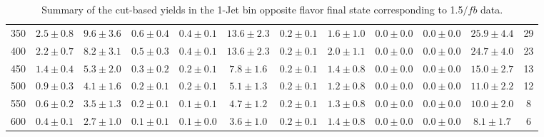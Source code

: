 \begin{table}[!hb]
{\begin{center}
\begin{tabular}{l c c c c c c c c c c c }
350 & $2.5\pm0.8$ & $9.6\pm3.6$ & $0.6\pm0.4$ & $0.4\pm0.1$ & $13.6\pm2.3$ & $0.2\pm0.1$ & $1.6\pm1.0$ & $0.0\pm0.0$ & $0.0\pm0.0$ & $25.9\pm4.4$ & 29 \\
400 & $2.2\pm0.7$ & $8.2\pm3.1$ & $0.5\pm0.3$ & $0.4\pm0.1$ & $13.6\pm2.3$ & $0.2\pm0.1$ & $2.0\pm1.1$ & $0.0\pm0.0$ & $0.0\pm0.0$ & $24.7\pm4.0$ & 23 \\
450 & $1.4\pm0.4$ & $5.3\pm2.0$ & $0.3\pm0.2$ & $0.2\pm0.1$ & $7.8\pm1.6$ & $0.2\pm0.1$ & $1.4\pm0.8$ & $0.0\pm0.0$ & $0.0\pm0.0$ & $15.0\pm2.7$ & 13 \\
500 & $0.9\pm0.3$ & $4.1\pm1.6$ & $0.2\pm0.1$ & $0.2\pm0.1$ & $5.1\pm1.3$ & $0.2\pm0.1$ & $1.2\pm0.8$ & $0.0\pm0.0$ & $0.0\pm0.0$ & $11.0\pm2.2$ & 12 \\
550 & $0.6\pm0.2$ & $3.5\pm1.3$ & $0.2\pm0.1$ & $0.1\pm0.1$ & $4.7\pm1.2$ & $0.2\pm0.1$ & $1.3\pm0.8$ & $0.0\pm0.0$ & $0.0\pm0.0$ & $10.0\pm2.0$ & 8 \\
600 & $0.4\pm0.1$ & $2.7\pm1.0$ & $0.1\pm0.1$ & $0.1\pm0.0$ & $3.6\pm1.0$ & $0.2\pm0.1$ & $1.4\pm0.8$ & $0.0\pm0.0$ & $0.0\pm0.0$ & $8.1\pm1.7$ & 6 \\
\hline
\end{tabular}
\end{center}
}
\caption{Summary of the cut-based yields in the 1-Jet bin opposite flavor final state corresponding to 1.5$/fb$ data.}
\end{table}
